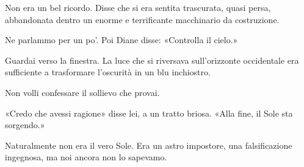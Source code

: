 Non era un bel ricordo. Disse che si era sentita trascurata, quasi
persa, abbandonata dentro un enorme e terrificante macchinario da
costruzione.

Ne parlammo per un po'. Poi Diane disse: «Controlla il cielo.»

Guardai verso la finestra. La luce che si riversava sull'orizzonte
occidentale era sufficiente a trasformare l'oscurità in un blu
inchiostro.

Non volli confessare il sollievo che provai.

«Credo che avessi ragione» disse lei, a un tratto briosa. «Alla fine, il
Sole sta sorgendo.»

Naturalmente non era il vero Sole. Era un astro impostore, una
falsificazione ingegnosa, ma noi ancora non lo sapevamo.